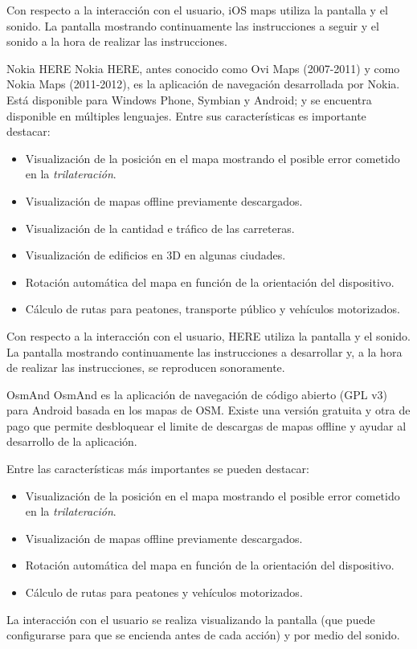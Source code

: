 \begin{definitionlist}
    Con respecto a la interacción con el usuario, iOS maps utiliza la pantalla y el sonido. La
    pantalla mostrando continuamente las instrucciones a seguir y el sonido a la hora de realizar
    las instrucciones.

  \item[Nokia HERE] Nokia HERE, antes conocido como Ovi Maps (2007-2011) y como Nokia Maps
    (2011-2012), es la aplicación de navegación desarrollada por Nokia. Está disponible para Windows
    Phone, Symbian y Android; y se encuentra disponible en múltiples lenguajes. Entre sus
    características es importante destacar:

    \begin{itemize}
      \item Visualización de la posición en el mapa mostrando el posible error cometido en la
        \emph{trilateración}.
      \item Visualización de mapas offline previamente descargados.
      \item Visualización de la cantidad e tráfico de las carreteras.
      \item Visualización de edificios en 3D en algunas ciudades.
      \item Rotación automática del mapa en función de la orientación del dispositivo.
      \item Cálculo de rutas para peatones, transporte público y vehículos motorizados.
    \end{itemize}

    Con respecto a la interacción con el usuario, HERE utiliza la pantalla y el sonido. La
    pantalla mostrando continuamente las instrucciones a desarrollar y, a la hora de realizar
    las instrucciones, se reproducen sonoramente.

  \item[OsmAnd] OsmAnd es la aplicación de navegación de código abierto (GPL v3) para Android basada
    en los mapas de \acf{OSM}. Existe una versión gratuita y otra de pago que permite desbloquear el
    limite de descargas de mapas offline y ayudar al desarrollo de la aplicación.

    Entre las características más importantes se pueden destacar:

    \begin{itemize}
      \item Visualización de la posición en el mapa mostrando el posible error cometido en la
        \emph{trilateración}.
      \item Visualización de mapas offline previamente descargados.
      \item Rotación automática del mapa en función de la orientación del dispositivo.
      \item Cálculo de rutas para peatones y vehículos motorizados.
    \end{itemize}

    La interacción con el usuario se realiza visualizando la pantalla (que puede configurarse para
    que se encienda antes de cada acción) y por medio del sonido.

\end{definitionlist}


